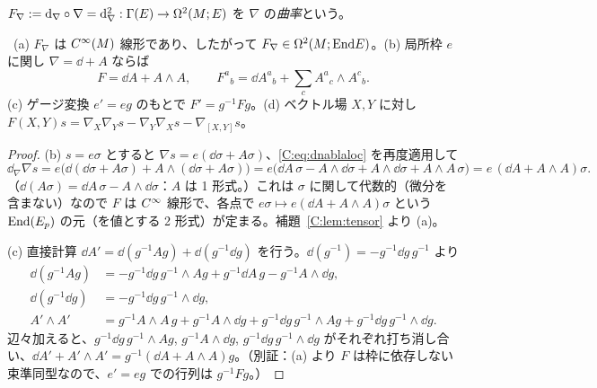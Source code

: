 \begin{defn}[曲率]\label{C:def:curv}
$F_\nabla:=\mathrm{d}_\nabla\circ\nabla=\mathrm{d}_\nabla^2:\Gamma(E)\to\Omega^2(M;E)$ を $\nabla$ の\emph{曲率}という。
\end{defn}
\begin{thm}[曲率の公式]\label{C:thm:curv}\tP\
(a) $F_\nabla$ は $C^\infty(M)$ 線形であり、したがって $F_\nabla\in\Omega^2(M;\mathrm{End} E)$。(b) 局所枠 $e$ に関し $\nabla=\dd+A$ ならば
\begin{equation}\label{C:eq:F}
F=\dd A+A\wedge A,\qquad F^a{}_b=\dd A^a{}_b+\sum_cA^a{}_c\wedge A^c{}_b.
\end{equation}
(c) ゲージ変換 $e'=eg$ のもとで $F'=g^{-1}Fg$。(d) ベクトル場 $X,Y$ に対し $F(X,Y)s=\nabla_X\nabla_Ys-\nabla_Y\nabla_Xs-\nabla_{[X,Y]}s$。
\end{thm}
\begin{proof}
(b) $s=e\sigma$ とすると $\nabla s=e(\dd\sigma+A\sigma)$、\eqref{C:eq:dnablaloc} を再度適用して
\[
\dd_\nabla\nabla s=e\bigl(\dd(\dd\sigma+A\sigma)+A\wedge(\dd\sigma+A\sigma)\bigr)=e\bigl(\dd A\,\sigma-A\wedge\dd\sigma+A\wedge\dd\sigma+A\wedge A\,\sigma\bigr)=e\,(\dd A+A\wedge A)\sigma.
\]
（$\dd(A\sigma)=\dd A\,\sigma-A\wedge\dd\sigma$：$A$ は 1 形式。）これは $\sigma$ に関して代数的（微分を含まない）なので $F$ は $C^\infty$ 線形で、各点で $e\sigma\mapsto e(\dd A+A\wedge A)\sigma$ という $\mathrm{End}(E_p)$ の元（を値とする 2 形式）が定まる。補題~\ref{C:lem:tensor} より (a)。

(c) 直接計算 $\dd A'=\dd(g^{-1}Ag)+\dd(g^{-1}\dd g)$ を行う。$\dd(g^{-1})=-g^{-1}\dd g\,g^{-1}$ より
\begin{align*}
\dd(g^{-1}Ag)&=-g^{-1}\dd g\,g^{-1}\wedge Ag+g^{-1}\dd A\,g-g^{-1}A\wedge\dd g,\\
\dd(g^{-1}\dd g)&=-g^{-1}\dd g\,g^{-1}\wedge\dd g,\\
A'\wedge A'&=g^{-1}A\wedge A\,g+g^{-1}A\wedge\dd g+g^{-1}\dd g\,g^{-1}\wedge Ag+g^{-1}\dd g\,g^{-1}\wedge\dd g.
\end{align*}
辺々加えると、$g^{-1}\dd g\,g^{-1}\wedge Ag$, $g^{-1}A\wedge\dd g$, $g^{-1}\dd g\,g^{-1}\wedge\dd g$ がそれぞれ打ち消し合い、$\dd A'+A'\wedge A'=g^{-1}(\dd A+A\wedge A)g$。（別証：(a) より $F$ は枠に依存しない束準同型なので、$e'=eg$ での行列は $g^{-1}Fg$。）


\end{proof}
